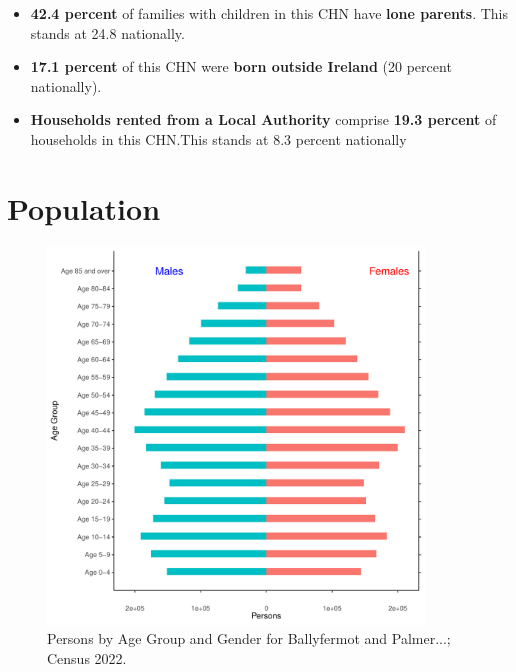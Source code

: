 \documentclass{article}
\begin{document}
\begin{itemize}
\item \textbf{42.4 percent} of families with children in this CHN have \textbf{lone parents}. This stands at 24.8 nationally.

\item \textbf{17.1 percent} of this CHN were \textbf{born outside Ireland} (20 percent nationally).

\item \textbf{Households rented from a Local Authority} comprise \textbf{19.3 percent} of households in this CHN.This stands at 8.3 percent nationally

\end{itemize}

\pagebreak

\section{Population} 
\label{sect:Pop}

\begin{figure}[h]
	\centering
	\includegraphics[width = 100mm]{../figures/PyramidPlot.pdf}
	\caption{Persons by Age Group and Gender for Ballyfermot and Palmer...; Census 2022.}
	\label{fig:2ae19629-1a6a-13a3-e055-000000000001}
	\end{figure}
\end{document}
